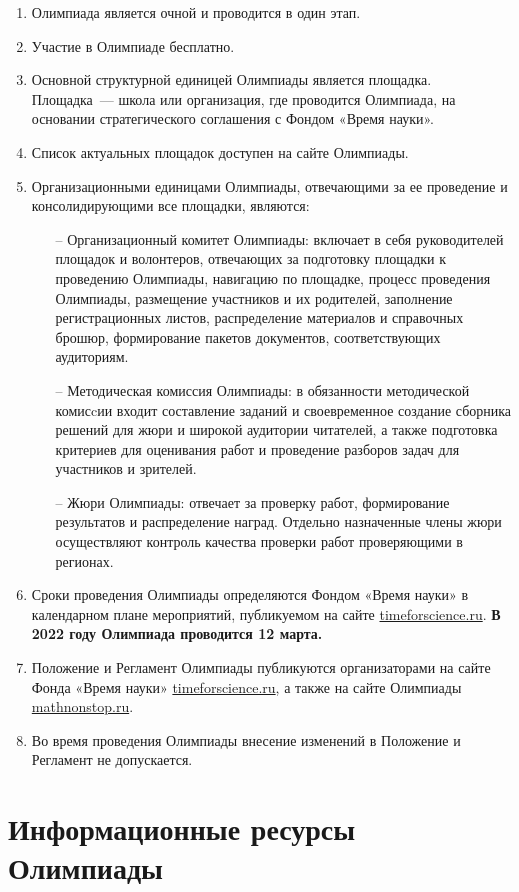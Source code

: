 \documentclass[a4paper,12pt]{article}
\newcommand{\surl}[1]{{\small\url{#1}}}
\begin{document}
\begin{enumerate}
	\item Олимпиада является очной и проводится в один этап.
	\item Участие в Олимпиаде бесплатно.
	\item Основной структурной единицей Олимпиады является площадка. Площадка~— школа или организация, где проводится Олимпиада, на основании стратегического соглашения с Фондом «Время науки».
	\item Список актуальных площадок доступен на сайте Олимпиады.
	\item Организационными единицами Олимпиады, отвечающими за ее проведение и консолидирующими все площадки, являются: \begin{enumerate}
	   \item[–] Организационный комитет Олимпиады: включает в себя руководителей площадок и волонтеров, отвечающих за подготовку площадки к проведению Олимпиады, навигацию по площадке, процесс проведения Олимпиады, размещение участников и их родителей, заполнение регистрационных листов, распределение материалов и справочных брошюр, формирование пакетов документов, соответствующих аудиториям.
	   \item[–] Методическая комиссия Олимпиады: в обязанности методической комисcии входит составление заданий и своевременное создание сборника решений для жюри и широкой аудитории читателей, а также подготовка критериев для оценивания работ и проведение разборов задач для участников и зрителей.
	   \item[–] Жюри Олимпиады: отвечает за проверку работ, формирование результатов и распределение наград. Отдельно назначенные члены жюри осуществляют контроль качества проверки работ проверяющими в регионах.
   \end{enumerate}
	\item Сроки проведения Олимпиады определяются Фондом «Время науки» в календарном плане мероприятий, публикуемом на сайте \surl{timeforscience.ru}. {\bf В 2022 году Олимпиада проводится 12 марта.}
	\item Положение и Регламент Олимпиады публикуются организаторами на сайте Фонда «Время науки» \surl{timeforscience.ru}, а также на сайте Олимпиады \surl{mathnonstop.ru}.
	\item Во время проведения Олимпиады внесение изменений в Положение и Регламент не допускается.
\end{enumerate}

\section{Информационные ресурсы Олимпиады}
\end{document}
